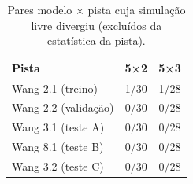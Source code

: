 \begin{table}[htbp]
    \centering
    \caption{Pares modelo × pista cuja simulação livre divergiu (excluídos da estatística da pista).}
    \label{tab:divergencias}
    \small
    \begin{tabular}{lcc}
        \toprule
        \textbf{Pista} & \textbf{5×2} & \textbf{5×3} \\
        \midrule
        Wang 2.1 (treino) & 1/30 & 1/28 \\
        Wang 2.2 (validação) & 0/30 & 0/28 \\
        Wang 3.1 (teste A) & 0/30 & 0/28 \\
        Wang 8.1 (teste B) & 0/30 & 0/28 \\
        Wang 3.2 (teste C) & 0/30 & 0/28 \\
        \bottomrule
    \end{tabular}
\end{table}
